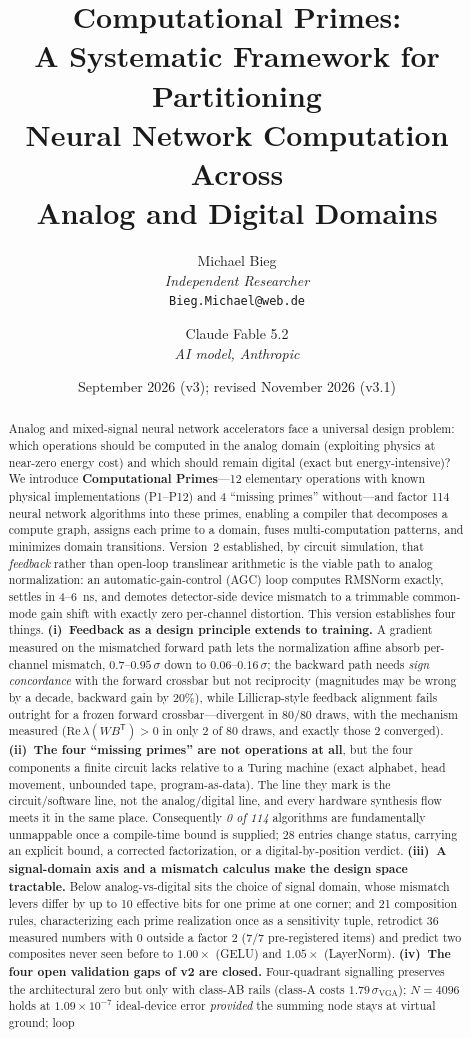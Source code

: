 \documentclass[11pt]{article}
\title{Computational Primes:\\A Systematic Framework for Partitioning\\Neural Network Computation Across\\Analog and Digital Domains}
\author{Michael Bieg\\
\textit{Independent Researcher}\\
\texttt{Bieg.Michael@web.de}
\and
Claude Fable 5.2\\
\textit{AI model, Anthropic}}
\date{September 2026 (v3); revised November 2026 (v3.1)}
\begin{document}
\maketitle

\begin{abstract}
Analog and mixed-signal neural network accelerators face a universal design problem: which operations should be computed in the analog domain (exploiting physics at near-zero energy cost) and which should remain digital (exact but energy-intensive)? We introduce \textbf{Computational Primes}---12 elementary operations with known physical implementations (P1--P12) and 4 ``missing primes'' without---and factor 114 neural network algorithms into these primes, enabling a compiler that decomposes a compute graph, assigns each prime to a domain, fuses multi-computation patterns, and minimizes domain transitions. Version~2 established, by circuit simulation, that \textit{feedback} rather than open-loop translinear arithmetic is the viable path to analog normalization: an automatic-gain-control (AGC) loop computes RMSNorm exactly, settles in 4--6~ns, and demotes detector-side device mismatch to a trimmable common-mode gain shift with exactly zero per-channel distortion. This version establishes four things. \textbf{(i)~Feedback as a design principle extends to training.} A gradient measured on the mismatched forward path lets the normalization affine absorb per-channel mismatch, $0.7$--$0.95\,\sigma$ down to $0.06$--$0.16\,\sigma$; the backward path needs \textit{sign concordance} with the forward crossbar but not reciprocity (magnitudes may be wrong by a decade, backward gain by 20\%), while Lillicrap-style feedback alignment fails outright for a frozen forward crossbar---divergent in 80/80 draws, with the mechanism measured ($\mathrm{Re}\,\lambda(W B^{\mathsf T})>0$ in only 2 of 80 draws, and exactly those 2 converged). \textbf{(ii)~The four ``missing primes'' are not operations at all}, but the four components a finite circuit lacks relative to a Turing machine (exact alphabet, head movement, unbounded tape, program-as-data). The line they mark is the circuit/software line, not the analog/digital line, and every hardware synthesis flow meets it in the same place. Consequently \textit{0 of 114} algorithms are fundamentally unmappable once a compile-time bound is supplied; 28 entries change status, carrying an explicit bound, a corrected factorization, or a digital-by-position verdict. \textbf{(iii)~A signal-domain axis and a mismatch calculus make the design space tractable.} Below analog-vs-digital sits the choice of signal domain, whose mismatch levers differ by up to 10 effective bits for one prime at one corner; and 21 composition rules, characterizing each prime realization once as a sensitivity tuple, retrodict 36 measured numbers with 0 outside a factor 2 (7/7 pre-registered items) and predict two composites never seen before to $1.00\times$ (GELU) and $1.05\times$ (LayerNorm). \textbf{(iv)~The four open validation gaps of v2 are closed.} Four-quadrant signalling preserves the architectural zero but only with class-AB rails (class-A costs $1.79\,\sigma_{\mathrm{VGA}}$); $N=4096$ holds at $1.09\times10^{-7}$ ideal-device error \textit{provided} the summing node stays at virtual ground; loop 
\end{abstract}
\end{document}
